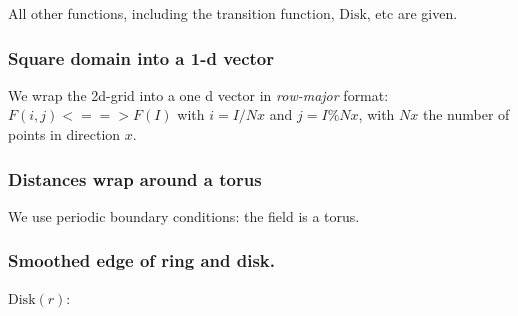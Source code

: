 All other functions, including the transition function, $\mathrm{Disk}$,
etc are given.

\subsubsection{Square domain into a 1-d
vector}\label{square-domain-into-a-1-d-vector}

We wrap the 2d-grid into a one d vector in \emph{row-major} format:
$F(i, j) <==> F(I)$ with $i = I / Nx$ and $j = I \% Nx$, with $Nx$ the
number of points in direction $x$.

\subsubsection{Distances wrap around a
torus}\label{distances-wrap-around-a-torus}

We use periodic boundary conditions: the field is a torus.

\begin{Shaded}
\end{Shaded}

\subsubsection{Smoothed edge of ring and
disk.}\label{smoothed-edge-of-ring-and-disk.}

$\mathrm{Disk}(r)$:

\begin{Shaded}
\begin{Highlighting}[]

  \NormalTok{\{}
  \NormalTok{)}
     \NormalTok{;}
  \NormalTok{)}
     \NormalTok{;}
    
\NormalTok{\}}
\end{Highlighting}
\end{Shaded}

